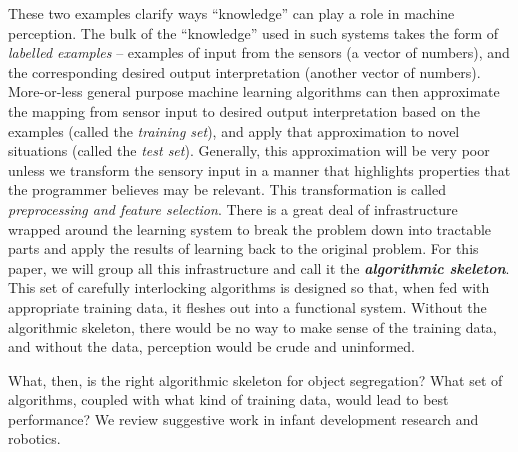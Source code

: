 These two examples clarify ways ``knowledge'' can play a role in
machine perception.  The bulk of the ``knowledge'' used in
such systems takes the form
of {\em labelled examples} -- examples of input from the sensors (a
vector of numbers), and the corresponding desired output
interpretation (another vector of numbers).  
%
More-or-less general
purpose machine learning algorithms can then approximate the mapping
from sensor input to desired output interpretation based on the
examples (called the {\em training set}), and apply that approximation to novel
situations (called the {\em test set}).  
%
Generally, this approximation will be very poor unless we transform
the sensory input in a manner that highlights properties that the
programmer believes may be relevant.  This transformation is called
{\em preprocessing and feature selection}.
%
There is a great deal of
infrastructure wrapped around the learning system
to break the problem down into tractable parts and
apply the results of learning back to the original
problem.
%
%
For this paper, we will group all this infrastructure and call it 
the {\bf \em algorithmic skeleton}.
%
%
This set of carefully interlocking algorithms is designed so that,
when fed with appropriate training data, it fleshes out into a
functional system.  Without the algorithmic skeleton, there would be
no way to make sense of the training data, and without the data,
perception would be crude and uninformed.

What, then, is the right algorithmic skeleton for object
segregation?  What set of algorithms, coupled with what kind of
training data, would lead to best performance?  
%
%
We review suggestive
work in infant development research and robotics.







